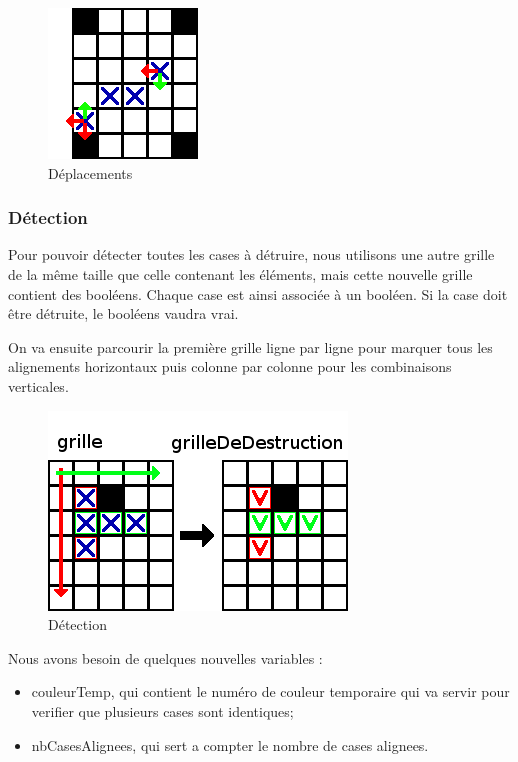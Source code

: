 \begin{figure}[ht]
	\center
	\caption{\label{verifDepl} Déplacements}
	\includegraphics{imgs/verifDepl}
\end{figure}
		
\subsubsection{Détection}	
	
Pour pouvoir détecter toutes les cases à détruire, nous utilisons une autre grille de la même taille que celle contenant les éléments, mais cette nouvelle grille contient des booléens. Chaque case est ainsi associée à un booléen. Si la case doit être détruite, le booléens vaudra vrai.

On va ensuite parcourir la première grille ligne par ligne pour marquer tous les alignements horizontaux puis colonne par colonne pour les combinaisons verticales.

\begin{figure}[ht]
	\center
	\caption{\label{Detection} Détection}
	\includegraphics{imgs/Detection}
\end{figure}

Nous avons besoin de quelques nouvelles variables :

\begin{itemize}
\item
	couleurTemp, qui contient le numéro de couleur temporaire qui va servir pour verifier que plusieurs cases sont identiques;
\item
	nbCasesAlignees, qui sert a compter le nombre de cases alignees.
\end{itemize}

